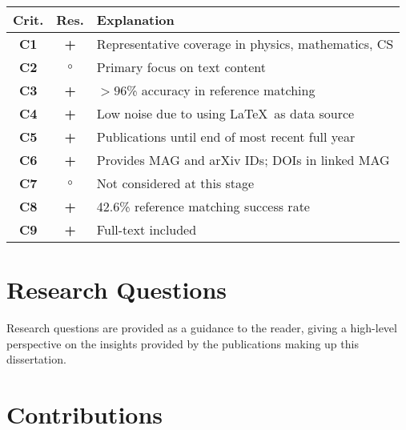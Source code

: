\begin{infobox-progress}
      \begin{tabular}{ccl}
        \toprule
        Crit.\tnote{a} & Res.\tnote{b} & Explanation \\
        \midrule
        \textbf{C1} & {\large\textbf{+}} & Representative coverage in physics, mathematics, CS \\
        \textbf{C2} & $\circ$ & Primary focus on text content \\
        \textbf{C3} & {\large\textbf{+}} & $>96$\% accuracy in reference matching \\
        \textbf{C4} & {\large\textbf{+}} & Low noise due to using \LaTeX\ as data source \\
        \textbf{C5} & {\large\textbf{+}} & Publications until end of most recent full year \\
        \textbf{C6} & {\large\textbf{+}} & Provides MAG and arXiv IDs; DOIs in linked MAG \\
        \textbf{C7} & $\circ$ & Not considered at this stage \\
        \textbf{C8} & {\large\textbf{+}} & 42.6\% reference matching success rate \\
        \textbf{C9} & {\large\textbf{+}} & Full-text included \\
        \bottomrule
      \end{tabular}
\end{infobox-progress}

\section{Research Questions}

Research questions are provided as a guidance to the reader, giving a high-level perspective on the insights provided by the publications making up this dissertation.

\section{Contributions}

